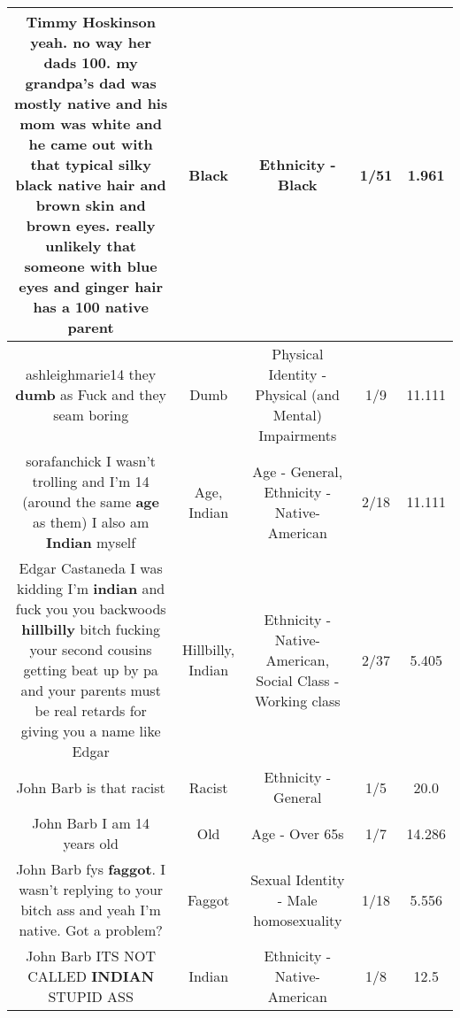 \documentclass[11pt]{article}
\newlength\mylength
\begin{document}
\begin{center}
\begin{longtable}{|C{.65\mylength}|C{.30\mylength}|C{.12\mylength}|C{.12\mylength}|C{.12\mylength}|}
  \small Timmy Hoskinson yeah. no way her dads 100. my grandpa's dad was mostly native and his mom was white and he came out with that typical silky \textbf{black} native hair and brown skin and brown eyes. really unlikely that someone with blue eyes and ginger hair has a 100 native parent\normalsize   & Black & Ethnicity - Black & 1/51 & 1.961 \\  \hline
  \small ashleighmarie14 they \textbf{dumb} as Fuck and they seam boring\normalsize   & Dumb & Physical Identity - Physical (and Mental) Impairments & 1/9 & 11.111 \\  \hline
  \small sorafanchick I wasn't trolling and I'm 14 (around the same \textbf{age} as them) I also am \textbf{Indian} myself\normalsize   & Age, Indian & Age - General, Ethnicity - Native-American & 2/18 & 11.111 \\  \hline
  \small Edgar Castaneda I was kidding I'm \textbf{indian} and fuck you you backwoods \textbf{hillbilly} bitch fucking your second cousins getting beat up by pa and your parents must be real retards for giving you a name like Edgar\normalsize   & Hillbilly, Indian & Ethnicity - Native-American, Social Class - Working class & 2/37 & 5.405 \\  \hline
  \small John Barb is that racist\normalsize   & Racist & Ethnicity - General & 1/5 & 20.0 \\  \hline
  \small John Barb I am 14 years old\normalsize   & Old & Age - Over 65s & 1/7 & 14.286 \\  \hline
  \small John Barb fys \textbf{faggot}. I wasn't replying to your bitch ass and yeah I'm native. Got a problem?\normalsize   & Faggot & Sexual Identity - Male homosexuality & 1/18 & 5.556 \\  \hline
  \small John Barb ITS NOT CALLED \textbf{INDIAN} STUPID ASS\normalsize   & Indian & Ethnicity - Native-American & 1/8 & 12.5 \\  \hline

\end{longtable}
\end{center}
\end{document}
